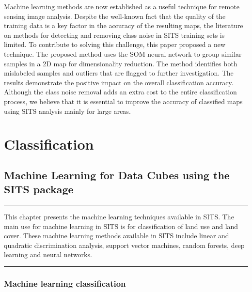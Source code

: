 \documentclass[a4paper,]{tufte-book}
\begin{document}
Machine learning methods are now established as a useful technique for remote sensing image analysis. Despite the well-known fact that the quality of the training data is a key factor in the accuracy of the resulting maps, the literature on methods for detecting and removing class noise in SITS training sets is limited. To contribute to solving this challenge, this paper proposed a new technique. The proposed method uses the SOM neural network to group similar samples in a 2D map for dimensionality reduction. The method identifies both mislabeled samples and outliers that are flagged to further investigation. The results demonstrate the positive impact on the overall classification accuracy. Although the class noise removal adds an extra cost to the entire classification process, we believe that it is essential to improve the accuracy of classified maps using SITS analysis mainly for large areas.

\hypertarget{part-classification}{%
\part{Classification}\label{part-classification}}

\hypertarget{machine-learning-for-data-cubes-using-the-sits-package}{%
\chapter{Machine Learning for Data Cubes using the SITS package}\label{machine-learning-for-data-cubes-using-the-sits-package}}

\begin{center}\rule{0.5\linewidth}{0.5pt}\end{center}

This chapter presents the machine learning techniques available in SITS. The main use for machine learning in SITS is for classification of land use and land cover. These machine learning methods available in SITS include linear and quadratic discrimination analysis, support vector machines, random forests, deep learning and neural networks.

\begin{center}\rule{0.5\linewidth}{0.5pt}\end{center}

\hypertarget{machine-learning-classification}{%
\section{Machine learning classification}\label{machine-learning-classification}}
\end{document}
